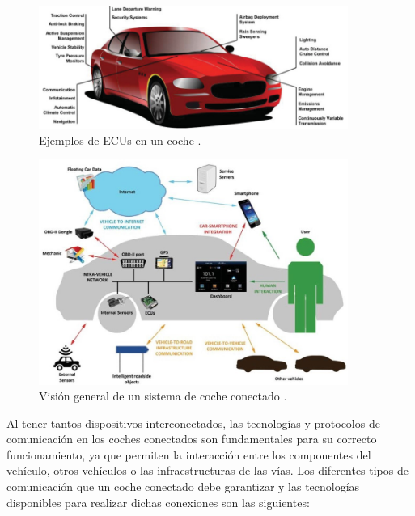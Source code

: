 \documentclass[12pt]{report} %
\begin{document}
\begin{figure}[h]
    \centering
    \includegraphics[width=0.9\textwidth]{ecu.png}
    \caption{Ejemplos de ECUs en un coche \cite{mobileIntegration}.}
    \label{fig:imagen3}
\end{figure}

\begin{figure}[H]
    \centering
    \includegraphics[width=0.9\textwidth]{connected_car_system.jpg}
	\caption{Visión general de un sistema de coche conectado \cite{mobileIntegration}.}
    \label{fig:imagen4}
\end{figure}

Al tener tantos dispositivos interconectados, las tecnologías y protocolos de comunicación en los coches conectados son fundamentales para su correcto funcionamiento, ya que permiten la interacción entre los componentes del vehículo, otros vehículos o las infraestructuras de las vías. Los diferentes tipos de comunicación que un coche conectado debe garantizar y las tecnologías disponibles para realizar dichas conexiones son las siguientes: 
\end{document}
